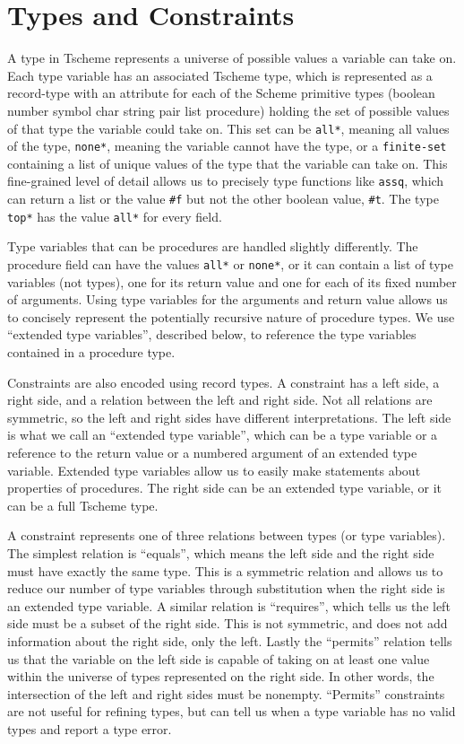 \documentclass[a4paper]{article}
\begin{document}
\section{Types and Constraints}
\label{sec:types-and-constraints}

A type in Tscheme represents a universe of possible values a variable can take 
on.  Each type variable has an associated Tscheme type, which is represented 
as a record-type with an attribute for each of the Scheme primitive types 
(boolean number symbol char string pair list procedure) holding the set of 
possible values of that type the variable could take on.  This set can be
{\tt *all*}, meaning all values of the type, {\tt *none*}, meaning the 
variable cannot have the type, or a {\tt finite-set} containing a list of unique
values of the type that the variable can take on.  This fine-grained level of 
detail allows us to precisely type functions like {\tt assq}, which can return 
a list or the value {\tt \#f} but not the other boolean value, {\tt \#t}.
The type {\tt *top*} has the value {\tt *all*} for every field.  

Type variables that can be procedures are handled slightly differently.  The 
procedure field can have the values {\tt *all*} or {\tt *none*}, or it can 
contain a list of type variables (not types), one for its return value and one 
for each of its fixed number of arguments.  Using type variables for the 
arguments and return value allows us to concisely represent the potentially 
recursive nature of procedure types. We use ``extended type variables'', 
described below, to reference the type variables contained in a procedure type.  

Constraints are also encoded using record types.  A constraint has a left 
side, a right side, and a relation between the left and right side.  Not all 
relations are symmetric, so the left and right sides have different 
interpretations.  The left side is what we call an ``extended type variable'', 
which can be a type variable or a reference to the return value or a numbered 
argument of an extended type variable.  Extended type variables allow us to 
easily make statements about properties of procedures.  The right side can be 
an extended type variable, or it can be a full Tscheme type.

A constraint represents one of three relations between types (or type 
variables). The simplest relation is ``equals'', which means the left side and 
the right side must have exactly the same type.  This is a symmetric relation 
and allows us to reduce our number of type variables through substitution when 
the right side is an extended type variable.
A similar relation is ``requires'', which tells us the left side must be a 
subset of the right side.  This is not symmetric, and does not add information 
about the right side, only the left.  Lastly the ``permits'' relation tells us 
that the variable on the left side is capable of taking on at least one value 
within the universe of types represented on the right side.  In other words, 
the intersection of the left and right sides must be nonempty.  ``Permits'' 
constraints are not useful for refining types, but can tell us when a type 
variable has no valid types and report a type error.  
\end{document}
